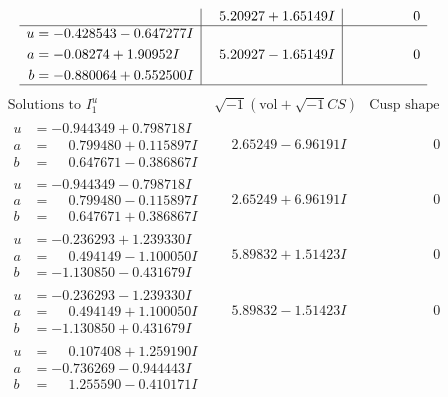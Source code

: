 \documentclass[1p]{elsarticle_modified}
\theoremstyle{definition}
\newcommand{\I}{\sqrt{-1}}
\begin{document}
$$\begin{array}{c|c|c}
 & \phantom{-}5.20927 + 1.65149 I & \phantom{-0.000000 } 0 \\ \hline\begin{aligned}
u &= -0.428543 - 0.647277 I \\
a &= -0.08274 + 1.90952 I \\
b &= -0.880064 + 0.552500 I\end{aligned}
 & \phantom{-}5.20927 - 1.65149 I & \phantom{-0.000000 } 0\\
 \hline 
 \end{array}$$\newpage$$\begin{array}{c|c|c}  
\text{Solutions to }I^u_{1}& \I (\text{vol} + \sqrt{-1}CS) & \text{Cusp shape}\\
 \hline 
\begin{aligned}
u &= -0.944349 + 0.798718 I \\
a &= \phantom{-}0.799480 + 0.115897 I \\
b &= \phantom{-}0.647671 - 0.386867 I\end{aligned}
 & \phantom{-}2.65249 - 6.96191 I & \phantom{-0.000000 } 0 \\ \hline\begin{aligned}
u &= -0.944349 - 0.798718 I \\
a &= \phantom{-}0.799480 - 0.115897 I \\
b &= \phantom{-}0.647671 + 0.386867 I\end{aligned}
 & \phantom{-}2.65249 + 6.96191 I & \phantom{-0.000000 } 0 \\ \hline\begin{aligned}
u &= -0.236293 + 1.239330 I \\
a &= \phantom{-}0.494149 - 1.100050 I \\
b &= -1.130850 - 0.431679 I\end{aligned}
 & \phantom{-}5.89832 + 1.51423 I & \phantom{-0.000000 } 0 \\ \hline\begin{aligned}
u &= -0.236293 - 1.239330 I \\
a &= \phantom{-}0.494149 + 1.100050 I \\
b &= -1.130850 + 0.431679 I\end{aligned}
 & \phantom{-}5.89832 - 1.51423 I & \phantom{-0.000000 } 0 \\ \hline\begin{aligned}
u &= \phantom{-}0.107408 + 1.259190 I \\
a &= -0.736269 - 0.944443 I \\
b &= \phantom{-}1.255590 - 0.410171 I\end{aligned}

\end{array}$$
\end{document}
